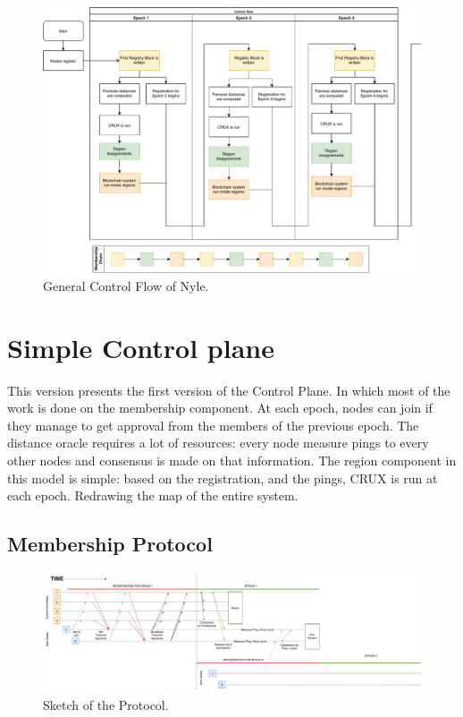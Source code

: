 \documentclass[a4paper,11pt,oneside]{report}
\begin{document}
\begin{figure}[!h] 
\centering
\includegraphics[width=400pt]{figures/Nyle_controlflow}
\caption{General Control Flow of Nyle. }
\label{fig:controlflow}
\end{figure}

\section{Simple Control plane} This version presents the first
version of the Control Plane. In which most of the work is done on the
membership component. At each epoch, nodes can join if they manage to get
approval from the members of the previous epoch. The distance oracle requires a lot of resources: every node measure pings to every other nodes and
consensus is made on that information. The region component in this model is
simple: based on the registration, and the pings, CRUX is run at each
epoch. Redrawing the map of the entire system. 

\subsection{Membership Protocol}

\begin{figure}
\centering
\includegraphics[width=700pt]{figures/Registrationprotocol}
\caption{Sketch of the Protocol.}
\label{fig:registrationprotocol}
\end{figure}
\end{document}
